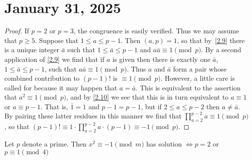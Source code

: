 \documentclass[11pt]{article}
\begin{document}
\section{January 31, 2025}
\begin{proof}
    If \(p = 2\) or \(p = 3\), the congruence is easily verified. Thus we may assume that \(p \geq 5\). Suppose that \(1 \leq a \leq p - 1\). Then \((a, p) = 1\), so that by~\cref{2.9} there is a unique integer \(\bar{a}\) such that \(1 \leq \bar{a} \leq p - 1\) and \(a\bar{a} \equiv 1 \pmod{p}\). By a second application of \cref{2.9} we find that if \(a\) is given then there is exactly one \(\bar{a}\), \(1 \leq \bar{a} \leq p - 1\), such that \(a\bar{a} \equiv 1 \pmod{p}\). Thus \(a\) and \(\bar{a}\) form a pair whose combined contribution to \((p - 1)!\) is \(\equiv 1 \pmod{p}\). However, a little care is called for because it may happen that \(a = \bar{a}\). This is equivalent to the assertion that \(a^2 \equiv 1 \pmod{p}\), and by \cref{2.10} we see that this is in turn equivalent to \(a \equiv 1\) or \(a \equiv p - 1\). That is, \(\bar{1} = 1\) and \(\overline{p - 1} = p - 1\), but if \(2 \leq a \leq p - 2\) then \(a \neq \bar{a}\). By pairing these latter residues in this manner we find that \(\prod_{a=2}^{p-2} a \equiv 1 \pmod{p}\), so that \((p - 1)! \equiv 1 \cdot \prod_{a=2}^{p-2} a \cdot (p - 1) \equiv -1 \pmod{p}\).
\end{proof}
\begin{theorem}\label{2.12}
    Let \(p\) denote a prime. Then \(x^2 \equiv -1 \pmod {m}\) has solution \(\Longleftrightarrow p = 2\) or \(p \equiv 1 \pmod{4}\)
\end{theorem}
\end{document}
